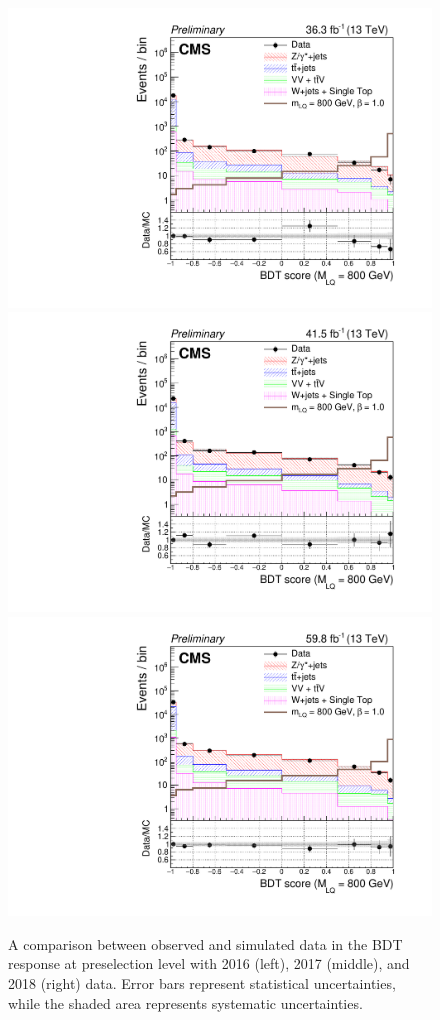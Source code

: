 \begin{figure}[H]
    {\includegraphics[width=.32\textwidth]{Images/Analysis/Results_2016_Unblinded/Plots/Preselection/BasicLQ_uujj_LQToBMu_pair_uubj_BDT_discrim_M800_standard.pdf}}
    {\includegraphics[width=.32\textwidth]{Images/Analysis/Results_2017_Unblinded/Plots/Preselection/BasicLQ_uujj_LQToBMu_pair_uubj_BDT_discrim_M800_standard.pdf}}
    {\includegraphics[width=.32\textwidth]{Images/Analysis/Results_2018_Unblinded/Plots/Preselection/BasicLQ_uujj_LQToBMu_pair_uubj_BDT_discrim_M800_standard.pdf}}
    \caption{A comparison between observed and simulated data in the BDT response at preselection level with 2016 (left), 2017 (middle), and 2018 (right) data. Error bars represent statistical uncertainties, while the shaded area represents systematic uncertainties.}
    \label{figapp:BDT600to800}
\end{figure}

